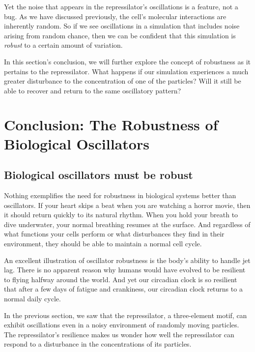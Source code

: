 Yet the noise that appears in the repressilator's oscillations is a feature, not a bug. As we have discussed previously, the cell's molecular interactions are inherently random. So if we see oscillations in a simulation that includes noise arising from random chance, then we can be confident that this simulation is \textit{robust} to a certain amount of variation.

In this section's conclusion, we will further explore the concept of robustness as it pertains to the repressilator. What happens if our simulation experiences a much greater disturbance to the concentration of one of the particles?  Will it still be able to recover and return to the same oscillatory pattern?


\FloatBarrier
{}

\section{Conclusion: The Robustness of Biological Oscillators}
\label{sec:biological_oscillators_must_be_robust}

\subsection{Biological oscillators must be robust}

Nothing exemplifies the need for robustness in biological systems better than oscillators. If your heart skips a beat when you are watching a horror movie, then it should return quickly to its natural rhythm. When you hold your breath to dive underwater, your normal breathing resumes at the surface. And regardless of what functions your cells perform or what disturbances they find in their environment, they should be able to maintain a normal cell cycle.

An excellent illustration of oscillator robustness is the body's ability to handle jet lag. There is no apparent reason why humans would have evolved to be resilient to flying halfway around the world. And yet our circadian clock is so resilient that after a few days of fatigue and crankiness, our circadian clock returns to a normal daily cycle.

In the previous section, we saw that the repressilator, a three-element motif, can exhibit oscillations even in a noisy environment of randomly moving particles. The repressilator's resilience makes us wonder how well the repressilator can respond to a disturbance in the concentrations of its particles.


